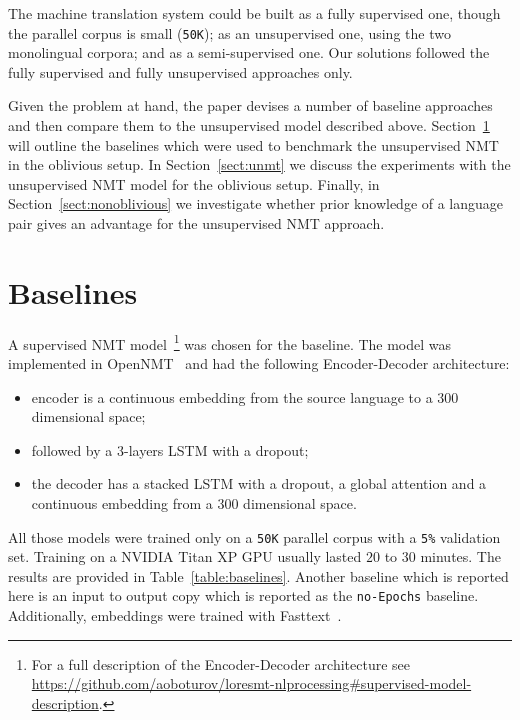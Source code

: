 \documentclass[]{article}
\begin{document}
The machine translation system could be built as a fully supervised one, though the parallel corpus is small ({\tt 50K}); as an unsupervised one, using the two monolingual corpora; and as a semi-supervised one.
Our solutions followed the fully supervised and fully unsupervised approaches only.

Given the problem at hand, the paper devises a number of baseline approaches and then compare them to the unsupervised model described above.
Section~\ref{sect:baselines} will outline the baselines which were used to benchmark the unsupervised NMT in the oblivious setup.
In Section~\ref{sect:unmt} we discuss the experiments with the unsupervised NMT model for the oblivious setup.
Finally, in Section~\ref{sect:nonoblivious} we investigate whether prior knowledge of a language pair gives an advantage for the unsupervised NMT approach.

\section{Baselines}
\label{sect:baselines}

A supervised NMT model~\footnote{For a full description of the Encoder-Decoder architecture see \url{https://github.com/aoboturov/loresmt-nlprocessing\#supervised-model-description}.} was chosen for the baseline.
The model was implemented in OpenNMT~\citep{opennmt} and had the following Encoder-Decoder architecture:
\begin{itemize}
\item encoder is a continuous embedding from the source language to a $300$ dimensional space;
\item followed by a $3$-layers LSTM with a dropout;
\item the decoder has a stacked LSTM with a dropout, a global attention \citep{luong2015effective} and a continuous embedding from a $300$ dimensional space.
\end{itemize}

All those models were trained only on a {\tt 50K} parallel corpus with a {\tt 5\%} validation set.
Training on a NVIDIA Titan XP GPU usually lasted $20$ to $30$ minutes.
The results are provided in Table~\ref{table:baselines}.
Another baseline which is reported here is an input to output copy which is reported as the {\tt no-Epochs} baseline.
Additionally, embeddings were trained with Fasttext~\citep{bojanowski2016enriching}.
\end{document}
